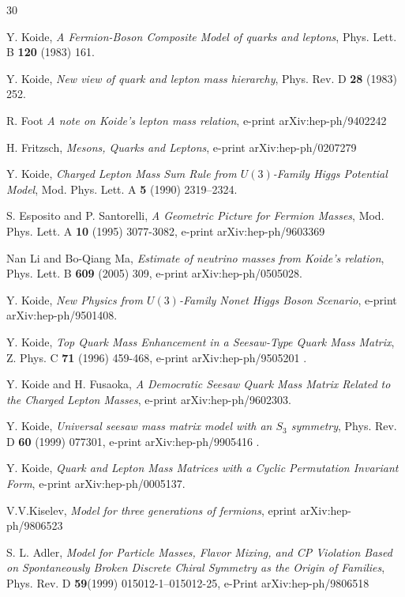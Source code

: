 \documentclass[12pt,a4paper]{article}
\begin{document}
\begin{thebibliography}{30}


 Y. Koide, {\it A Fermion-Boson Composite Model of quarks and leptons}, Phys. Lett. B {\bf 120} (1983) 161.
 
 Y. Koide, {\it New view of quark and lepton mass hierarchy}, Phys. Rev. D {\bf 28} (1983) 252. 

 R. Foot {\it A note on Koide's lepton mass relation}, e-print arXiv:hep-ph/9402242 

 H. Fritzsch, {\it Mesons, Quarks and Leptons}, e-print arXiv:hep-ph/0207279

 Y. Koide, {\it Charged Lepton Mass Sum Rule from $U(3)$-Family Higgs Potential Model}, Mod. Phys. Lett. A {\bf 5} (1990) 2319--2324.
 
 S. Esposito and P. Santorelli, {\it A Geometric Picture for Fermion Masses}, Mod. Phys. Lett. A {\bf 10} (1995) 3077-3082, e-print arXiv:hep-ph/9603369 

 Nan Li and Bo-Qiang Ma, {\it Estimate of neutrino masses from Koide's relation}, Phys. Lett. B {\bf 609} (2005) 309, e-print arXiv:hep-ph/0505028.

 Y. Koide, {\it  New Physics from $U(3)$-Family Nonet Higgs Boson Scenario}, e-print arXiv:hep-ph/9501408.

 Y. Koide, {\it Top Quark Mass Enhancement in a Seesaw-Type Quark Mass Matrix}, Z. Phys. C {\bf 71} (1996) 459-468, e-print arXiv:hep-ph/9505201 .

 Y. Koide and H. Fusaoka, {\it A Democratic Seesaw Quark Mass Matrix Related to the Charged Lepton Masses}, e-print arXiv:hep-ph/9602303.

 Y. Koide, {\it Universal seesaw mass matrix model with an $S_3$ symmetry}, Phys. Rev. D {\bf 60} (1999) 077301, e-print arXiv:hep-ph/9905416 .

 Y. Koide, {\it Quark and Lepton Mass Matrices with a Cyclic Permutation Invariant Form}, e-print arXiv:hep-ph/0005137.

V.V.Kiselev, {\it Model for three generations of fermions}, 
eprint arXiv:hep-ph/9806523 

 S. L. Adler, {\it Model for Particle Masses, Flavor Mixing, and CP Violation Based on Spontaneously Broken Discrete Chiral Symmetry as the Origin of Families}, Phys. Rev. D {\bf 59}(1999) 015012-1--015012-25, e-Print arXiv:hep-ph/9806518 


\end{thebibliography}
\end{document}
